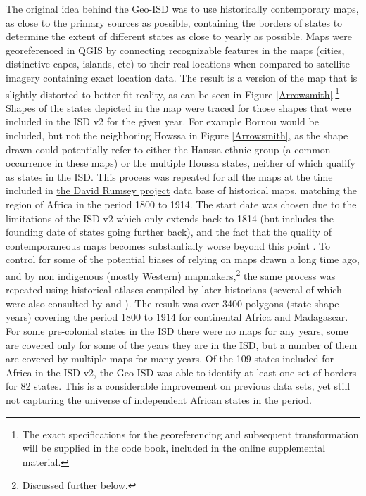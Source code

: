 \documentclass[12pt]{article}
\begin{document}
The original idea behind the Geo-ISD was to use historically contemporary maps,
as close to the primary sources as possible, containing the borders of states to
determine the extent of different states as close to yearly as possible. Maps
were georeferenced in QGIS by connecting recognizable features in the maps
(cities, distinctive capes, islands, etc) to their real locations when compared
to satellite imagery containing exact location data.  The result is a version of
the map that is slightly distorted to better fit reality, as can be seen in
Figure \ref{Arrowsmith}.\footnote{The exact specifications for the
georeferencing and subsequent transformation will be supplied in the code book,
included in the online supplemental material.} Shapes of the states depicted in
the map were traced for those shapes that were included in the ISD v2 for the
given year. For example Bornou would be included, but not the neighboring Howssa
in Figure \ref{Arrowsmith}, as the shape drawn could potentially refer to either
the Haussa ethnic group (a common occurrence in these maps) or the multiple
Houssa states, neither of which qualify as states in the ISD. This process was
repeated for all the maps at the time included in
\href{https://www.davidrumsey.com}{the David Rumsey project} data base of
historical maps, matching the region of Africa in the period 1800 to 1914. The
start date was chosen due to the limitations of the ISD v2 which only extends
back to 1814 (but includes the founding date of states going further back), and
the fact that the quality of contemporaneous maps becomes substantially  worse
beyond this point \citep{Bassett_1994}. To control for some of the potential
biases of relying on maps drawn a long time ago, and by non indigenous (mostly
Western) mapmakers,\footnote{Discussed further below.} the same process was
repeated using historical atlases compiled by later historians (several of which
were also consulted by \citet{Depetris-Chauvin2016} and \citet{Paine2019}). The
result was over 3400 polygons (state-shape-years) covering the period 1800 to
1914 for continental Africa and Madagascar. For some pre-colonial states in the
ISD there were no maps for any years, some are covered only for some of the
years they are in the ISD, but a number of them are covered by multiple maps for
many years. Of the 109 states included for Africa in the ISD v2, the Geo-ISD was
able to identify at least one set of borders for 82 states. This is a considerable
improvement on previous data sets, yet still not capturing the universe of
independent African states in the period.
\end{document}
